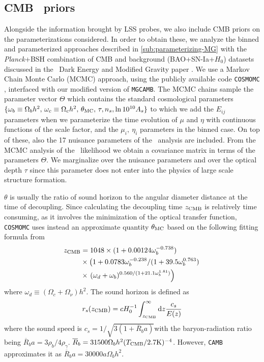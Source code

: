 \subsection{CMB \planck\ priors}
\label{sub:Fisher-Planck}
Alongside the information brought by LSS probes,
we also include CMB priors on the parameterizations considered. In
order to obtain these, we analyze the binned and parameterized approaches
described in \cref{sub:parameterizing-MG} with
the {\it Planck}+BSH combination of CMB and background (BAO+SN-Ia+$H_{0}$)
datasets discussed in the \planck\ Dark Energy and Modified Gravity paper
\cite{planck_collaboration_planck_2016}.
We use a Markov Chain Monte Carlo (MCMC) approach, using the publicly
available code \texttt{COSMOMC} \cite{lewis_cosmological_2002,lewis_efficient_2013},
interfaced with our modified version of \texttt{MGCAMB}. The MCMC
chains sample the parameter vector $\Theta$ which contains the standard
cosmological parameters
$\{\omega_{b}\equiv\Omega_{b}h^{2},\,\omega_{c}\equiv\Omega_{c}h^{2},\,\theta_{\rm MC},\,\tau,n_{s},\ln{10^{10}A_{s}}\}$
to which we add the $E_{ij}$ parameters when we parameterize the time
evolution of $\mu$ and $\eta$ with continuous functions of the scale factor, 
and the $\mu_{i},\ \eta_{i}$ parameters in the binned
case. On top of these, also the 17 nuisance parameters of the \planck\
analysis are included. From the MCMC analysis of the \planck\ likelihood
we obtain a covariance matrix in terms of the parameters $\Theta$.
We marginalize over the nuisance parameters and over the optical
depth $\tau$ since this parameter does not enter into
the physics of large scale structure formation.

$\theta$ is usually the ratio of sound horizon
to the angular diameter distance at the time of decoupling. Since
calculating the decoupling time $z_{\rm CMB}$ is relatively time consuming,
as it involves the minimization of the optical transfer function,
\texttt{COSMOMC} uses instead an approximate quantity $\theta_{\rm MC}$
based on the following fitting formula from \cite{hu_small_1996}
\begin{align}
z_{\rm CMB} & =1048\times(1+0.00124\omega_{b}^{-0.738})\nonumber \\
&
\times\left(1+0.0783\omega_{b}^{-0.238}/(1+39.5\omega_{b}^{0.763})\right.\nonumber
\\
& \times\left.(\omega_{d}+\omega_{b})^{0.560/(1+21.1\omega_{b}^{1.81})}\right)
\end{align}
where $\omega_{d}\equiv(\Omega_{c}+\Omega_{\nu})h^{2}$.
The sound horizon is defined as 
\begin{equation}
r_{s}(z_{\rm CMB})=cH_{0}^{-1}\int_{z_{\rm CMB}}^{\infty}\mbox{d}z\frac{c_{s}}{E(z)}
\end{equation}
where the sound speed is $c_{s}=1/\sqrt{3(1+\overline{R}_{b}a)}$with
the baryon-radiation ratio being $\overline{R}_{b}a=3\rho_{b}/4\rho_{\gamma}$.
$\overline{R}_{b}=31500\Omega_{b}h^{2}(T_{\rm CMB}/2.7\mbox{K})^{-4}$.
However, \texttt{CAMB }approximates it as
$\overline{R}_{b}a=30000a\Omega_{b}h^{2}$.

